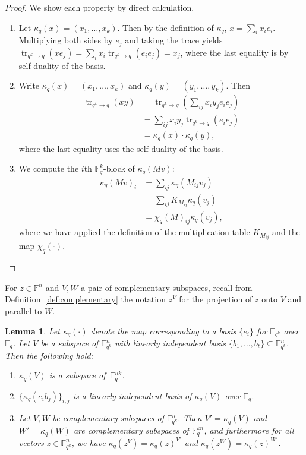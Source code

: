 \documentclass[11pt]{article}
\newtheorem{lemma}[theorem]{Lemma}
\theoremstyle{definition}
\newcommand{\F}{\ensuremath{\mathbb{F}}}
\newcommand{\downsize}{\kappa}
\newcommand{\downsizem}{\chi}
\DeclareMathOperator{\tr}{tr}
\begin{document}
\begin{proof}
  We show each property by direct calculation.
  \begin{enumerate}
    \item Let $\downsize_q(x) = (x_1, \dots, x_k)$. Then by the definition of
    $\downsize_q$, $x = \sum_i x_i e_i$. Multiplying both sides by $e_j$
    and taking the trace yields $\tr_{q^k \to q}(x e_j) = \sum_i x_i
    \tr_{q^k \to q}(e_i e_j) = x_j$, where the last equality is by
    self-duality of the basis.
    \item Write $\downsize_q(x) = (x_1, \dots, x_k)$ and $\downsize_q(y) =
      (y_1, \dots, y_k)$. Then
      \begin{align*}
        \tr_{q^k \to q} (xy) &= \tr_{q^k \to q}(\sum_{ij} x_i y_j e_i
                               e_j) \\
                             &= \sum_{ij} x_i y_j \tr_{q^k \to q}(  e_i
                               e_j) \\
                             &= \downsize_q(x) \cdot \downsize_q(y),
      \end{align*}
      where the last equality uses the self-duality of the basis.
    \item
      We compute the $i$th $\F_q^k$-block of $\downsize_q(Mv)$:
      \begin{align*}
        \downsize_q(Mv)_i &= \sum_{ij} \downsize_q(M_{ij} v_j) \\
                          &= \sum_{ij} K_{M_{ij}} \downsize_q(v_j) \\
                          &= \downsizem_q(M)_{ij} \downsize_q(v_j) ,
      \end{align*}
      where we have applied the definition of the multiplication table
      $K_{M_{ij}}$ and the map $\downsizem_q(\cdot)$.
  \end{enumerate}
\end{proof}

For $z\in \F^n$ and $V,W$ a pair of complementary subspaces, recall from
Definition~\ref{def:complementary} the notation $z^V$ for the projection of $z$
onto $V$ and parallel to $W$.

\begin{lemma}
  \label{lem:downsize_subspace}
  Let $\downsize_q(\cdot)$ denote the map corresponding to a
  basis $\{e_i\}$ for $\F_{q^k}$ over $\F_q$.
  Let $V$ be a subspace of $\F_{q^k}^n$ with linearly independent basis
  $\{b_1,\ldots,b_t\} \subseteq \F_{q^k}^n$.
  Then the following hold:
  \begin{enumerate}
 	\item $\downsize_q(V)$ is a subspace of $\,\F_{q}^{nk}$.
	\item $\{ \downsize_q(e_i b_j) \}_{i,j}$ is a linearly independent basis of
    $\downsize_q(V)$ over $\F_q$.
	\item Let $V, W$ be complementary subspaces of $\F_{q^k}^n$.
    Then $V' = \downsize_q(V)$ and $W' = \downsize_q(W)$ are complementary
    subspaces of $\F_q^{kn}$, and furthermore for all vectors $z \in
    \F_{q^k}^n$, we have $\downsize_q(z^V) = \downsize_q(z)^{V'}$ and
    $\downsize_q(z^W) = \downsize_q(z)^{W'}$.
  \end{enumerate}
\end{lemma}
\end{document}
